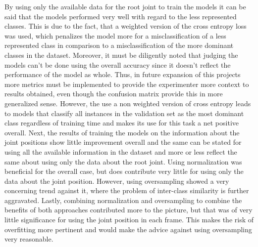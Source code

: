 		By using only the available data for the root joint to train the models it can be said that the models performed very well with regard to the less represented classes. This is due to the fact, that a weighted version of the cross entropy loss was used, which penalizes the model more for a misclassification of a less represented class in comparison to a misclassification of the more dominant classes in the dataset. Moreover, it must be diligently noted that judging the models can't be done using the overall accuracy since it doesn't reflect the performance of the model as whole. Thus, in future expansion of this projects more metrics must be implemented to provide the experimenter more context to results obtained, even though the confusion matrix provide this in more generalized sense. However, the use a non weighted version of cross entropy leads to models that classify all instances in the validation set as the most dominant class regardless of training time and makes its use for this task a net positive overall. Next, the results of training the models on the information about the joint positions show little improvement overall and the same can be stated for using all the available information in the dataset and more or less reflect the same about using only the data about the root joint.\newline
		Using normalization was beneficial for the overall case, but does contribute very little for using only the data about the joint position. However, using oversampling showed a very concerning trend against it, where the problem of inter-class similarity is further aggravated. Lastly, combining normalization and oversampling to combine the benefits of both approaches contributed more to the picture, but that was of very little significance for using the joint position in each frame. This makes the risk of overfitting more pertinent and would make the advice against using oversampling very reasonable.
